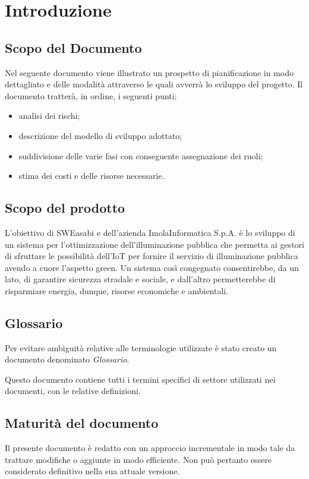 \chapter{Introduzione}

\section{Scopo del Documento}
Nel seguente documento viene illustrato un prospetto di pianificazione in modo dettagliato e delle modalità attraverso le quali avverrà lo sviluppo del progetto. Il documento tratterà, in ordine, i seguenti punti:
\begin{itemize}
    \item analisi dei rischi;
    \item descrizione del modello di sviluppo adottato;
    \item suddivisione delle varie fasi con conseguente assegnazione dei ruoli;
    \item stima dei costi e delle risorse necessarie.
\end{itemize}

\section{Scopo del prodotto}
L'obiettivo di SWEasabi e dell'azienda ImolaInformatica S.p.A. è lo sviluppo di un sistema per l'ottimizzazione dell'illuminazione pubblica che permetta ai gestori di sfruttare le possibilità dell'IoT per fornire il servizio di illuminazione pubblica avendo a cuore l'aspetto green. Un sistema così congegnato consentirebbe, da un lato, di garantire sicurezza stradale e sociale, e dall'altro permetterebbe di risparmiare energia, dunque, risorse economiche e ambientali.


\section{Glossario}
Per evitare ambiguità relative alle terminologie utilizzate è stato creato un documento denominato \textit{Glossario}.

Questo documento contiene tutti i termini specifici di settore utilizzati nei documenti, con le relative definizioni.

\section{Maturità del documento}
Il presente documento è redatto con un approccio incrementale in modo tale da trattare modifiche o aggiunte in modo efficiente. Non può pertanto essere considerato definitivo nella sua attuale versione.

